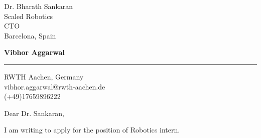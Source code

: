 \documentclass{letter} %
\date{24th September, 2019 } %
\begin{document}
\signature{Vibhor Aggarwal}           %
\longindentation=0pt                       %
\let\raggedleft\raggedright                %
 
 
\begin{letter}
{Dr. Bharath Sankaran\\
Scaled Robotics\\
CTO\\
Barcelona, Spain}
\begin{center}
{\large\bf Vibhor Aggarwal} 
\end{center}
\medskip\hrule height 1pt
\begin{center}
{RWTH Aachen, Germany  \\  vibhor.aggarwal@rwth-aachen.de \\ (+49)17659896222 } 
\end{center} \vfill %
 
 
\opening{Dear Dr. Sankaran,} 
I am writing to apply for the position of Robotics intern.


\end{letter}
\end{document}
